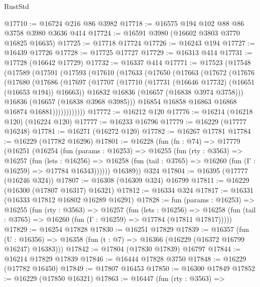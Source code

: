 \begin{lexlean}{RustStd}
\begin{coremodule}
@17710 := @16724 @216 @86 @3982
@17718 := @16575 @194 @102 @88 @86 @3758 @3980 @3636 @414
@17724 := @16591 @3980 (@16602 @3803 @3770 @16825 @16635)
@17725 := @17718 @17724
@17726 := @16243 @194
@17727 := @16439 @17726
@17728 := @17725 @17727
@17729 := @16313 @414
@17731 := @17728 (@16642 @17729)
@17732 := @16337 @414
@17771 := @17523
    (@17548
      (@17589
        (@17591
          (@17593
            (@17610
              (@17633
                (@17650
                  (@17663
                    (@17672
                      (@17676
                        (@17680
                          (@17686
                            (@17697
                              (@17707
                                (@17710 (@17731 (@16646 @17732) (@16651 (@16653 @194)) @16663))
                                @16832
                                @16836
                                (@16657 (@16838 @3974 @3758)))
                              @16836
                              (@16657 (@16838 @3968 @3985)))
                            @16854
                            @16858
                            @16863
                            @16868
                            @16874
                            @16881))))))))))))
@17772 := @16212 @120
@17776 := @16214 (@16218 @120) (@16224 @120)
@17777 := @16233 @16796
@17779 := @16229 (@17777 @16248)
@17781 := @16271 (@16272 @120)
@17782 := @16267 @17781
@17784 := @16229 (@17782 @16296)
@17801 := @16228
    (fun (fn : @74) =>
    @17779
      (@16251
        (@16254
          (fun (params : @16253) =>
          @16255
            (fun (rty : @3563) =>
            @16257
              (fun (lets : @16256) =>
              @16258 (fun (tail : @3765) => @16260 (fun (Γ : @16259) => @17784 @16343))))))
        @16389))
    @324
@17804 := @16395 (@17777 (@16246 @324))
@17807 := @16308 (@16309 @324) @16799
@17811 := @16229 (@16300 (@17807 @16317) @16321)
@17812 := @16334 @324
@17817 := @16331 (@16333 @17812 @16802 @16289 @16291)
@17828 := fun (params : @16253) =>
  @16255
    (fun (rty : @3563) =>
    @16257
      (fun (lets : @16256) =>
      @16258 (fun (tail : @3765) => @16260 (fun (Γ : @16259) => @17784 (@17811 @17817)))))
@17829 := @16254 @17828
@17830 := @16251 @17829
@17839 := @16357
    (fun (U : @16356) => @16358 (fun (t : @7) => @16366 (@16229 (@16372 @16799 @16247) @16383)))
@17842 := @17804 (@17830 @17839) @16797
@17844 := @16214 @17829 @17839
@17846 := @16444 @17828 @3750
@17848 := @16229 (@17782 @16450)
@17849 := @17807 @16453
@17850 := @16300 @17849
@17852 := @16229 (@17850 @16321)
@17863 := @16447
    (fun (rty : @3563) =>

\end{coremodule}
\end{lexlean}
